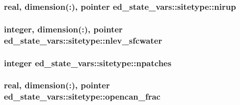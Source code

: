 \subsubsection[{\texorpdfstring{nirup}{nirup}}]{\setlength{\rightskip}{0pt plus 5cm}real, dimension(\+:), pointer ed\+\_\+state\+\_\+vars\+::sitetype\+::nirup}\hypertarget{structed__state__vars_1_1sitetype_a214f7e2691c21fff0459d5293229cdd9}{}\label{structed__state__vars_1_1sitetype_a214f7e2691c21fff0459d5293229cdd9}
\subsubsection[{\texorpdfstring{nlev\+\_\+sfcwater}{nlev_sfcwater}}]{\setlength{\rightskip}{0pt plus 5cm}integer, dimension(\+:), pointer ed\+\_\+state\+\_\+vars\+::sitetype\+::nlev\+\_\+sfcwater}\hypertarget{structed__state__vars_1_1sitetype_a9da494bbe974c078af56fc08955dddd8}{}\label{structed__state__vars_1_1sitetype_a9da494bbe974c078af56fc08955dddd8}
\subsubsection[{\texorpdfstring{npatches}{npatches}}]{\setlength{\rightskip}{0pt plus 5cm}integer ed\+\_\+state\+\_\+vars\+::sitetype\+::npatches}\hypertarget{structed__state__vars_1_1sitetype_a3225f7a2a86ac1667828ea13baea3d32}{}\label{structed__state__vars_1_1sitetype_a3225f7a2a86ac1667828ea13baea3d32}
\subsubsection[{\texorpdfstring{opencan\+\_\+frac}{opencan_frac}}]{\setlength{\rightskip}{0pt plus 5cm}real, dimension(\+:), pointer ed\+\_\+state\+\_\+vars\+::sitetype\+::opencan\+\_\+frac}\hypertarget{structed__state__vars_1_1sitetype_a544ab8596524ec20f62cd6c79ee167a9}{}\label{structed__state__vars_1_1sitetype_a544ab8596524ec20f62cd6c79ee167a9}
